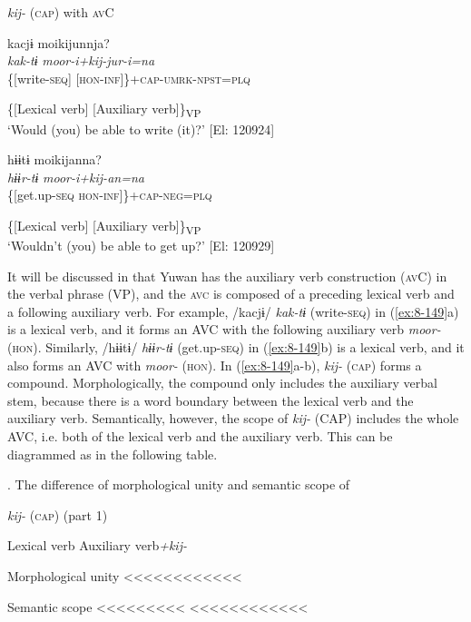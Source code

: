 \ea\label{ex:8-149}
  \textit{kij-} (\textsc{cap}) with \textsc{av}C

\ea
{\TM}
\glll  kacjɨ  moikijunnja?\\
\textit{kak-tɨ}  \textit{moor-i+kij-jur-i=na}\\
\{[write-\textsc{seq}]  [\textsc{hon}-\textsc{inf}]\}+\textsc{cap}-\textsc{umrk}-\textsc{npst}=\textsc{plq}

      \{[Lexical verb]  [Auxiliary verb]\}\textsubscript{VP}\\
\glt ‘Would (you) be able to write (it)?’ [El: 120924]

\ex
{\TM}
\glll  hɨɨtɨ  moikijanna?\\
\textit{hɨɨr-tɨ}  \textit{moor-i+kij-an=na}\\
\{[get.up-\textsc{seq}  \textsc{hon}-\textsc{inf}]\}+\textsc{cap}-\textsc{neg}=\textsc{plq}

      \{[Lexical verb]  [Auxiliary verb]\}\textsubscript{VP}\\
\glt ‘Wouldn’t (you) be able to get up?’ [El: 120929]
\z
\z

It will be discussed in  that Yuwan has the auxiliary verb construction (\textsc{av}C) in the verbal phrase (VP), and the \textsc{avc} is composed of a preceding lexical verb and a following auxiliary verb. For example, /kacjɨ/ \textit{kak-tɨ} (write-\textsc{seq}) in (\ref{ex:8-149}a) is a lexical verb, and it forms an AVC with the following auxiliary verb \textit{moor-} (\textsc{hon}). Similarly, /hɨɨtɨ/ \textit{hɨɨr-tɨ} (get.up-\textsc{seq}) in (\ref{ex:8-149}b) is a lexical verb, and it also forms an AVC with \textit{moor-} (\textsc{hon}). In (\ref{ex:8-149}a-b), \textit{kij-} (\textsc{cap}) forms a compound. Morphologically, the compound only includes the auxiliary verbal stem, because there is a word boundary between the lexical verb and the auxiliary verb. Semantically, however, the scope of \textit{kij-} (CAP) includes the whole AVC, i.e. both of the lexical verb and the auxiliary verb. This can be diagrammed as in the following table.

\begin{table}
\caption{\label{tab:key:89}. The difference of morphological unity and semantic scope of} \textmd{\textit{kij-}}\textmd{ (\textsc{cap}) (part 1)}

  Lexical verb  Auxiliary verb\textit{+kij-}

Morphological unity    <<<<<<<<<<<<

Semantic scope  <<<<<<<<<  <<<<<<<<<<<<
\end{table}

